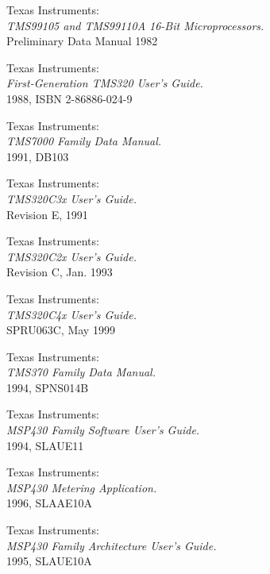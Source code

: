  Texas Instruments: \\
                 {\em TMS99105 and TMS99110A 16-Bit Microprocessors.\/} \\
                 Preliminary Data Manual
                 1982

 Texas Instruments: \\
                {\em First-Generation TMS320 User's Guide.\/} \\
                1988, ISBN 2-86886-024-9

 Texas Instruments: \\
                 {\em TMS7000 Family Data Manual.\/} \\
                 1991, DB103

 Texas Instruments: \\
                {\em TMS320C3x User's Guide.\/} \\
                Revision E, 1991

 Texas Instruments: \\
                {\em TMS320C2x User's Guide.\/} \\
                Revision C, Jan. 1993

 Texas Instruments: \\
                   {\em TMS320C4x User's Guide.\/} \\
                   SPRU063C, May 1999

 Texas Instruments: \\
                {\em TMS370 Family Data Manual.\/} \\
                1994, SPNS014B

 Texas Instruments: \\
                       {\em MSP430 Family Software User's Guide.\/} \\
                       1994, SLAUE11

 Texas Instruments: \\
                   {\em MSP430 Metering Application.\/} \\
                   1996, SLAAE10A

 Texas Instruments: \\
                       {\em MSP430 Family Architecture User's Guide.\/} \\
                       1995, SLAUE10A


